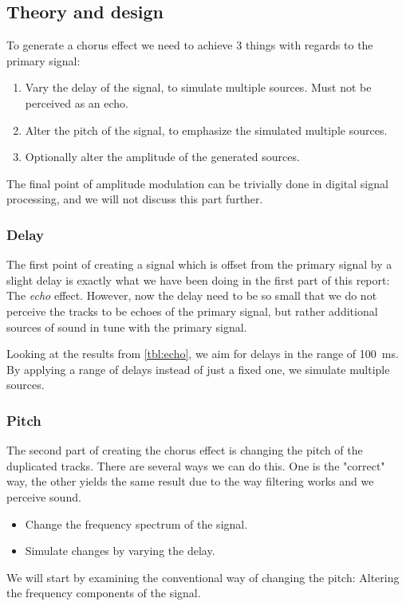 
\subsection{Theory and design}
To generate a chorus effect we need to achieve 3 things with regards to the primary signal:
\begin{enumerate}
	\item Vary the delay of the signal, to simulate multiple sources. Must not be perceived as an echo.
	\item Alter the pitch of the signal, to emphasize the simulated multiple sources.
	\item Optionally alter the amplitude of the generated sources.
\end{enumerate}

The final point of amplitude modulation can be trivially done in digital signal processing, and we will not discuss this part further.

\subsubsection{Delay}
The first point of creating a signal which is offset from the primary signal by a slight delay is exactly what we have been doing in the first part of this report: The \emph{echo} effect. However, now the delay need to be so small that we do not perceive the tracks to be echoes of the primary signal, but rather additional sources of sound in tune with the primary signal.

Looking at the results from \cref{tbl:echo}, we aim for delays in the range of \SI{100}{\milli\second}. By applying a range of delays instead of just a fixed one, we simulate multiple sources.

\subsubsection{Pitch}
The second part of creating the chorus effect is changing the pitch of the duplicated tracks. There are several ways we can do this. One is the "correct" way, the other yields the same result due to the way filtering works and we perceive sound.
\begin{itemize}
	\item Change the frequency spectrum of the signal.
	\item Simulate changes by varying the delay.
\end{itemize}
We will start by examining the conventional way of changing the pitch: Altering the frequency components of the signal.

